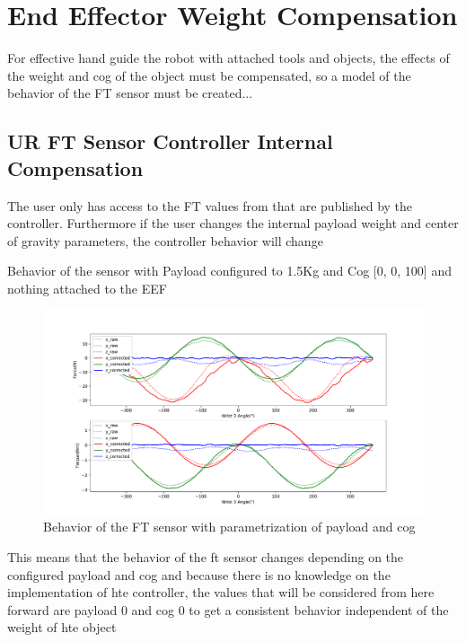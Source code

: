 \section{End Effector Weight Compensation}

\par For effective hand guide the robot with attached tools and objects, the effects of the weight and cog of the object must be compensated, so a model of the behavior of the FT sensor must be created...

\subsection{UR FT Sensor Controller Internal Compensation}

\par The user only has access to the FT values from that are published by the controller. Furthermore if the user changes the internal payload weight and center of gravity parameters, the controller behavior will change

\par Behavior of the sensor with Payload configured to 1.5Kg and Cog [0, 0, 100] and nothing attached to the EEF

\begin{figure}[h]
    \centering
    \includegraphics[width=\linewidth]{figs/chp3/ft_sensor_behavior.pdf}
    \caption{Behavior of the FT sensor with parametrization of payload and cog }
    \label{fig:ft_sensor_behavior}
\end{figure}

\par This means that the behavior of the ft sensor changes depending on the configured payload and cog and because there is no knowledge on the implementation of hte controller, the values that will be considered from here forward are payload 0 and cog 0 to get a consistent behavior independent of the weight of hte object 


